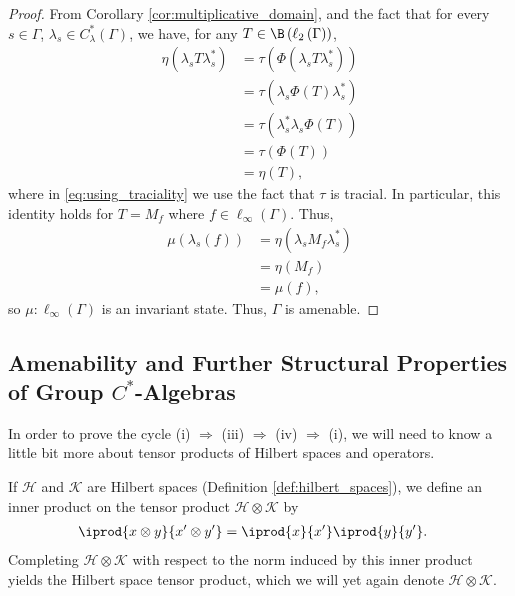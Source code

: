 \begin{proof}
  From Corollary \ref{cor:multiplicative_domain}, and the fact that for every $s\in\Gamma$, $\lambda_s\in C^{\ast}_{\lambda}\left( \Gamma \right)$, we have, for any $T\in \B\left( \ell_2\left( \Gamma \right) \right)$,
  \begin{align*}
    \eta\left( \lambda_s T \lambda_s^{\ast} \right) &= \tau\left( \Phi\left( \lambda_s T \lambda_s^{\ast} \right) \right)\\
                                                    &= \tau\left( \lambda_s \Phi(T) \lambda_s^{\ast}\right)\\
                                                    &= \tau\left( \lambda_s^{\ast}\lambda_s\Phi(T) \right)\label{eq:using_traciality}\tag{\textasteriskcentered}\\
                                                    &= \tau\left( \Phi\left( T \right) \right)\\
                                                    &= \eta(T),
  \end{align*}
  where in \eqref{eq:using_traciality} we use the fact that $\tau$ is tracial. In particular, this identity holds for $T= M_f$ where $f\in \ell_{\infty}\left( \Gamma \right)$. Thus,
  \begin{align*}
    \mu\left( \lambda_s(f) \right) &= \eta\left( \lambda_sM_f\lambda_s^{\ast} \right)\\
                                   &= \eta\left( M_f \right)\\
                                   &= \mu\left( f \right),
  \end{align*}
  so $\mu\colon \ell_{\infty}\left( \Gamma \right)$ is an invariant state. Thus, $\Gamma$ is amenable.
\end{proof}

\subsection{Amenability and Further Structural Properties of Group $C^{\ast}$-Algebras}%
In order to prove the cycle (i) $\Rightarrow$ (iii) $\Rightarrow$ (iv) $\Rightarrow$ (i), we will need to know a little bit more about tensor products of Hilbert spaces and operators.\newline

If $\mathcal{H}$ and $\mathcal{K}$ are Hilbert spaces (Definition \ref{def:hilbert_spaces}), we define an inner product on the tensor product $\mathcal{H}\otimes \mathcal{K}$ by
\begin{align*}
  \iprod{x\otimes y}{x'\otimes y'} &= \iprod{x}{x'} \iprod{y}{y'}.
\end{align*}
Completing $\mathcal{H}\otimes \mathcal{K}$ with respect to the norm induced by this inner product yields the Hilbert space tensor product, which we will yet again denote $\mathcal{H}\otimes \mathcal{K}$.\newline


